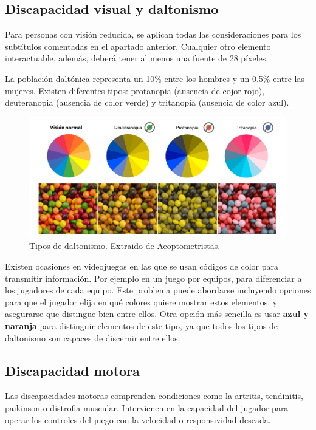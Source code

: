 \subsection{Discapacidad visual y daltonismo}

Para personas con visión reducida, se aplican todas las consideraciones para los subtítulos comentadas en el apartado anterior. Cualquier otro elemento interactuable, además, deberá tener al menos una fuente de 28 píxeles.

La población daltónica representa un 10\% entre los hombres y un 0.5\% entre las mujeres. Existen diferentes tipos: protanopia (ausencia de cojor rojo), deuteranopia (ausencia de color verde) y tritanopia (ausencia de color azul).

\begin{figure}[h]
    \centering
    \includegraphics[scale=0.28]{img/daltonismo.png}
    \caption[Tipos de daltonismo]{Tipos de daltonismo. Extraido de \href{https://optometristas.org/tratamiento-del-daltonismo}{Aeoptometristas}.}
    \label{fig:daltonismo}
\end{figure}

Existen ocasiones en videojuegos en las que se usan códigos de color para transmitir información. Por ejemplo en un juego por equipos, para diferenciar a los jugadores de cada equipo. Este problema puede abordarse incluyendo opciones para que el jugador elija en qué colores quiere mostrar estos elementos, y asegurarse que distingue bien entre ellos. Otra opción más sencilla es usar \textbf{azul y naranja} para distinguir elementos de este tipo, ya que todos los tipos de daltonismo son capaces de discernir entre ellos.

\subsection{Discapacidad motora}

Las discapacidades motoras comprenden condiciones como la artritis, tendinitis, paikinson o distrofia muscular. Intervienen en la capacidad del jugador para operar los controles del juego con la velocidad o responsividad deseada.

